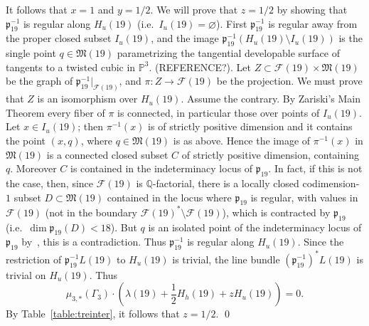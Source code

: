 \documentclass[11pt]{amsart}
\numberwithin{equation}{subsection}
\theoremstyle{plain}
\theoremstyle{remark}
\theoremstyle{definition}
\newcommand{\gp}{\mathfrak{p}}
\newcommand{\cF}{{\mathscr F}}
\newcommand{\es}{\varnothing}
\newcommand{\gM}{\mathfrak{M}}
\newcommand{\PP}{{\mathbb P}}
\newcommand{\QQ}{{\mathbb Q}}
\begin{document}
%
It follows that $x=1$ and $y=1/2$. We will prove that $z=1/2$ by showing that $\gp_{19}^{-1}$ is regular along $H_u(19)$ (i.e.~$I_u(19)=\es$).   First $\gp_{19}^{-1}$ is regular away from the proper closed subset $I_u(19)$, and the image $\gp_{19}^{-1}(H_u(19)\setminus I_u(19))$ is the single point  $q\in\gM(19)$ parametrizing the tangential developable surface of tangents to a twisted cubic in $\PP^3$. (REFERENCE?).
   Let $Z\subset \cF(19)\times\gM(19)$ be the graph of $\gp_{19}^{-1}|_{\cF(19)}$, and $\pi\colon Z\to\cF(19)$ be the projection. We must prove that $Z$ is an isomorphism over $H_u(19)$.  Assume the contrary. By Zariski's Main Theorem every fiber of $\pi$ is connected, in particular those over points of $I_u(19)$. Let $x\in I_u(19)$; then $\pi^{-1}(x)$ is of strictly positive dimension and it contains the point $(x,q)$, where $q\in\gM(19)$ is as above. Hence the image of $\pi^{-1}(x)$ in $\gM(19)$ is a connected closed subset $C$ of  strictly positive dimension,  containing $q$. Moreover $C$ is contained
   in the indeterminacy locus of $\gp_{19}$. In fact, if this is not the case, then, since $\cF(19)$ is $\QQ$-factorial, there is a locally closed codimension-$1$ subset $D\subset\gM(19)$ contained in the locus where $\gp_{19}$ is regular, with values in $\cF(19)$ (not in the boundary $\cF(19)^{*}\setminus\cF(19)$), which is contracted by $\gp_{19}$ (i.e.~$\dim\gp_{19}(D)<18$).  But $q$ is an isolated point of the indeterminacy  
  locus of $\gp_{19}$ by~\cite{shah}, this is a contradiction. Thus $\gp_{19}^{-1}$ is regular along $H_u(19)$. 
  Since the restriction of $\gp_{19}^{-1}L(19)$ to $H_u(19)$  is trivial, the line bundle $(\gp_{19}^{-1})^{*}L(19)$ is trivial on $H_u(19)$. Thus
\begin{equation*}
%
\mu_{3,*}(\Gamma_3)\cdot\left(\lambda(19)+\frac{1}{2} H_h(19)+z H_u(19)\right)=0.
%
\end{equation*}
%
By Table~\eqref{table:treinter}, it follows that   $z=1/2$.
%  
\qed
%

\end{document}
